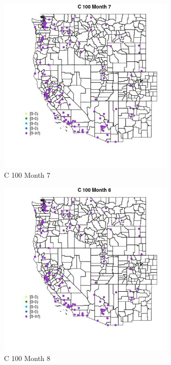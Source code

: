 \begin{figure} 
\centering  
\includegraphics[width=0.77\textwidth]{Code_Outputs/Report_ML_input_PM25_Step4_part_e_de_duplicated_aves_MapObsMo7C_100.jpg} 
\caption{\label{fig:Report_ML_input_PM25_Step4_part_e_de_duplicated_avesMapObsMo7C_100}C 100 Month 7} 
\end{figure} 
 

\begin{figure} 
\centering  
\includegraphics[width=0.77\textwidth]{Code_Outputs/Report_ML_input_PM25_Step4_part_e_de_duplicated_aves_MapObsMo8C_100.jpg} 
\caption{\label{fig:Report_ML_input_PM25_Step4_part_e_de_duplicated_avesMapObsMo8C_100}C 100 Month 8} 
\end{figure} 
 


